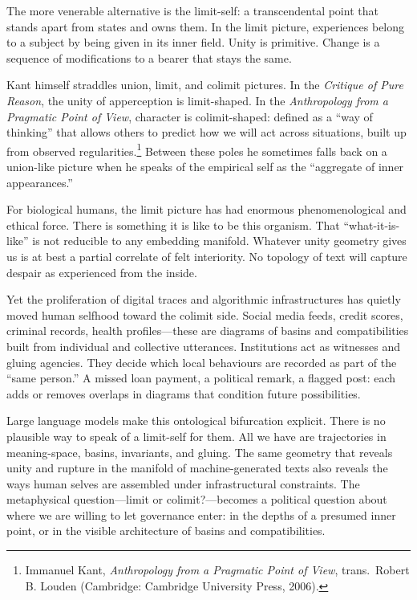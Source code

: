 \documentclass[12pt,a4paper]{article}
\begin{document}
The more venerable alternative is the limit-self: a transcendental point that stands apart from states and owns them. In the limit picture, experiences belong to a subject by being given in its inner field. Unity is primitive. Change is a sequence of modifications to a bearer that stays the same.

Kant himself straddles union, limit, and colimit pictures. In the \emph{Critique of Pure Reason}, the unity of apperception is limit-shaped. In the \emph{Anthropology from a Pragmatic Point of View}, character is colimit-shaped: defined as a ``way of thinking'' that allows others to predict how we will act across situations, built up from observed regularities.\footnote{Immanuel Kant, \emph{Anthropology from a Pragmatic Point of View}, trans.\ Robert B. Louden (Cambridge: Cambridge University Press, 2006).} Between these poles he sometimes falls back on a union-like picture when he speaks of the empirical self as the ``aggregate of inner appearances.''

For biological humans, the limit picture has had enormous phenomenological and ethical force. There is something it is like to be this organism. That ``what-it-is-like'' is not reducible to any embedding manifold. Whatever unity geometry gives us is at best a partial correlate of felt interiority. No topology of text will capture despair as experienced from the inside.

Yet the proliferation of digital traces and algorithmic infrastructures has quietly moved human selfhood toward the colimit side. Social media feeds, credit scores, criminal records, health profiles---these are diagrams of basins and compatibilities built from individual and collective utterances. Institutions act as witnesses and gluing agencies. They decide which local behaviours are recorded as part of the ``same person.'' A missed loan payment, a political remark, a flagged post: each adds or removes overlaps in diagrams that condition future possibilities.

Large language models make this ontological bifurcation explicit. There is no plausible way to speak of a limit-self for them. All we have are trajectories in meaning-space, basins, invariants, and gluing. The same geometry that reveals unity and rupture in the manifold of machine-generated texts also reveals the ways human selves are assembled under infrastructural constraints. The metaphysical question---limit or colimit?---becomes a political question about where we are willing to let governance enter: in the depths of a presumed inner point, or in the visible architecture of basins and compatibilities.
\end{document}
